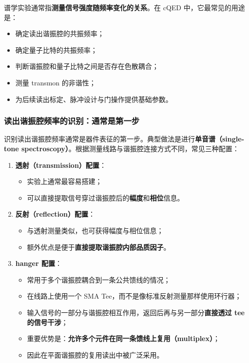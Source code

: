 \documentclass[12pt,a4paper,oneside]{ctexbook}
\begin{document}
谱学实验通常指\textbf{测量信号强度随频率变化的关系}。在 cQED 中，它最常见的用途是：
\begin{itemize}
    \item 确定读出谐振腔的共振频率；
    \item 确定量子比特的共振频率；
    \item 判断谐振腔和量子比特之间是否存在色散耦合；
    \item 测量 transmon 的非谐性；
    \item 为后续读出标定、脉冲设计与门操作提供基础参数。
\end{itemize}

\subsubsection{读出谐振腔频率的识别：通常是第一步}

识别读出谐振腔频率通常是器件表征的第一步。典型做法是进行\textbf{单音谱（single-tone spectroscopy）}。根据测量线路与谐振腔连接方式不同，常见三种配置：

\begin{enumerate}
    \item \textbf{透射（transmission）配置}：
    \begin{itemize}
        \item 实验上通常最容易搭建；
        \item 可以直接提取信号穿过谐振腔后的\textbf{幅度}和\textbf{相位}信息。
    \end{itemize}

    \item \textbf{反射（reflection）配置}：
    \begin{itemize}
        \item 与透射测量类似，也可获得幅度与相位信息；
        \item 额外优点是便于\textbf{直接提取谐振腔内部品质因子}。
    \end{itemize}

    \item \textbf{hanger 配置}：
    \begin{itemize}
        \item 常用于多个谐振腔耦合到一条公共馈线的情况；
        \item 在线路上使用一个 SMA Tee，而不是像标准反射测量那样使用环行器；
        \item 输入信号的一部分与谐振腔相互作用，返回后再与另一部分\textbf{直接透过 tee 的信号干涉}；
        \item 重要优势是：\textbf{允许多个元件在同一条馈线上复用（multiplex）}；
        \item 因此在平面谐振腔的复用读出中被广泛采用。
    \end{itemize}
\end{enumerate}
\end{document}
